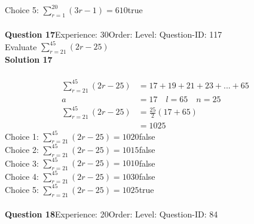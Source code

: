 \documentclass{article}
\begin{document}
Choice 5: \hspace{20pt}$\displaystyle\sum_{r=1}^{20} (3r-1)=610$\hspace{20pt}true\\
\\[4pt]
\noindent\textbf{Question 17}\hspace{20pt}Experience: 30\hspace{20pt}Order: \hspace{20pt}Level: \hspace{20pt}Question-ID: 117\\[2pt]
Evaluate $\displaystyle\sum_{r=21}^{45} (2r-25)$\\[4pt]
\noindent\textbf{Solution 17}\\[2pt]
\\[-35pt]\begin{align*}
\displaystyle\sum_{r=21}^{45} (2r-25)&=17+19+21+23+...+65\\[2pt]
a&=17\quad l=65 \quad n=25\\[2pt]
\displaystyle\sum_{r=21}^{45} (2r-25)&=\displaystyle\frac{25}{2}(17+65)\\[2pt]
&=1025
\end{align*}
Choice 1: \hspace{20pt}$\displaystyle\sum_{r=21}^{45} (2r-25)=1020$\hspace{20pt}false\\
Choice 2: \hspace{20pt}$\displaystyle\sum_{r=21}^{45} (2r-25)=1015$\hspace{20pt}false\\
Choice 3: \hspace{20pt}$\displaystyle\sum_{r=21}^{45} (2r-25)=1010$\hspace{20pt}false\\
Choice 4: \hspace{20pt}$\displaystyle\sum_{r=21}^{45} (2r-25)=1030$\hspace{20pt}false\\
Choice 5: \hspace{20pt}$\displaystyle\sum_{r=21}^{45} (2r-25)=1025$\hspace{20pt}true\\
\\[4pt]
\noindent\textbf{Question 18}\hspace{20pt}Experience: 20\hspace{20pt}Order: \hspace{20pt}Level: \hspace{20pt}Question-ID: 84\\[2pt]
\end{document}
